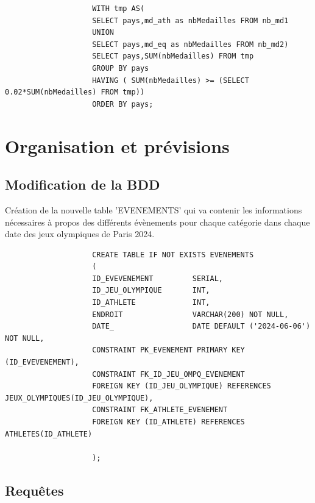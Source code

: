 \documentclass[]{scrreprt}
\begin{document}
			{\footnotesize 
				\begin{tcolorbox}
					\begin{verbatim}
					WITH tmp AS(
					SELECT pays,md_ath as nbMedailles FROM nb_md1
					UNION
					SELECT pays,md_eq as nbMedailles FROM nb_md2)
					SELECT pays,SUM(nbMedailles) FROM tmp
					GROUP BY pays
					HAVING ( SUM(nbMedailles) >= (SELECT 0.02*SUM(nbMedailles) FROM tmp))
					ORDER BY pays;	
					\end{verbatim}
				\end{tcolorbox}
			}
	
	\chapter{Organisation et prévisions}
		
		\section{Modification de la BDD}
			
			{\large 
				Création de la nouvelle table 'EVENEMENTS' qui va contenir les informations nécessaires à propos des différents évènements pour chaque catégorie dans chaque date des jeux olympiques de Paris 2024.
				
			}
			
			{\footnotesize 
				\begin{tcolorbox}
					\begin{verbatim}
					CREATE TABLE IF NOT EXISTS EVENEMENTS
					(
					ID_EVEVENEMENT         SERIAL,
					ID_JEU_OLYMPIQUE       INT,
					ID_ATHLETE             INT,
					ENDROIT                VARCHAR(200) NOT NULL,
					DATE_                  DATE DEFAULT ('2024-06-06') NOT NULL,
					CONSTRAINT PK_EVENEMENT PRIMARY KEY (ID_EVEVENEMENT),
					CONSTRAINT FK_ID_JEU_OMPQ_EVENEMENT 
					FOREIGN KEY (ID_JEU_OLYMPIQUE) REFERENCES JEUX_OLYMPIQUES(ID_JEU_OLYMPIQUE),
					CONSTRAINT FK_ATHLETE_EVENEMENT 
					FOREIGN KEY (ID_ATHLETE) REFERENCES ATHLETES(ID_ATHLETE)
					
					);
					\end{verbatim}
				\end{tcolorbox}
			}
			
			\vspace{0.5cm}
			
		
		\section{Requêtes}
		
\end{document}
